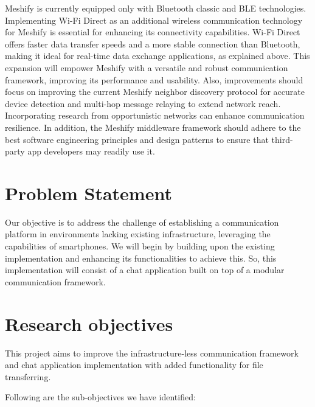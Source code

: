 \documentclass[12pt, conference, onecolumn, a4paper]{IEEEtran}
\begin{document}
Meshify is currently equipped only with Bluetooth classic and BLE technologies.
Implementing Wi-Fi Direct as an additional wireless communication technology
for Meshify is essential for enhancing its connectivity capabilities. Wi-Fi
Direct offers faster data transfer speeds and a more stable connection than
Bluetooth, making it ideal for real-time data exchange applications, as
explained above. This expansion will empower Meshify with a versatile and
robust communication framework, improving its performance and usability. Also,
improvements should focus on improving the current Meshify neighbor discovery
protocol for accurate device detection and multi-hop message relaying to extend
network reach. Incorporating research from opportunistic networks can enhance
communication resilience. In addition, the Meshify middleware framework should
adhere to the best software engineering principles and design patterns to
ensure that third-party app developers may readily use it.

\section{Problem Statement}

Our objective is to address the challenge of establishing a communication
platform in environments lacking existing infrastructure, leveraging the
capabilities of smartphones. We will begin by building upon the existing
implementation and enhancing its functionalities to achieve this. So, this
implementation will consist of a chat application built on top of a modular
communication framework.

\section{Research objectives}
This project aims to improve the infrastructure-less communication framework
and chat application implementation with added functionality for file
transferring.

Following are the sub-objectives we have identified:
\end{document}
